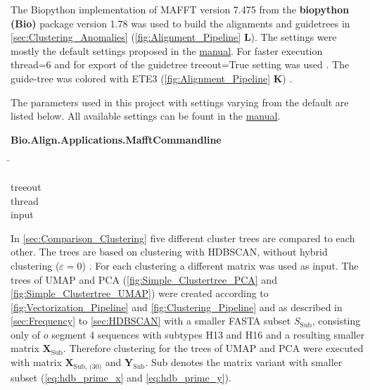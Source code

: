 The Biopython implementation of MAFFT version 7.475 from the \textbf{biopython (Bio)} package version 1.78 was used to build the alignments and guidetrees in \autoref{sec:Clustering_Anomalies} \autocite{katoh_mafft_2013, cock_biopython_2009} (\autoref{fig:Alignment_Pipeline} \textsf{\textbf{L}}). The settings were mostly the default settings proposed in the \href{https://mafft.cbrc.jp/alignment/software/}{manual}. For faster execution \colorbox{backcolour}{thread=6} and for export of the guidetree \colorbox{backcolour}{treeout=True} setting was used \autocite{katoh_mafft_2013, cock_biopython_2009}. The guide-tree was colored with ETE3 (\autoref{fig:Alignment_Pipeline} \textsf{\textbf{K}}) \autocite{huerta-cepas_ete_2016}.

The parameters used in this project with settings varying from the default are listed below. All available settings can be fount in the \href{https://mafft.cbrc.jp/alignment/software/}{manual}.

\begin{leftbar}
    \textbf{Bio.Align.Applications.MafftCommandline}
    \begin{nstabbing}
        \qquad\qquad\qquad\qquad\qquad\quad\=\kill
    
        treeout \\
        
        thread \\
        
        input 
        
    \end{nstabbing}
\end{leftbar}

In \autoref{sec:Comparison_Clustering} five different cluster trees are compared to each other. The trees are based on clustering with \gls{HDBSCAN}, without hybrid clustering ($\varepsilon=0$) \autocite{malzer_hybrid_2020, mcinnes_hdbscan_2017}. For each clustering a different matrix was used as input. The trees of \gls{UMAP} and \gls{PCA} (\autoref{fig:Simple_Clustertree_PCA} and \autoref{fig:Simple_Clustertree_UMAP}) were created according to \autoref{fig:Vectorization_Pipeline} and \autoref{fig:Clustering_Pipeline} and as described in \autoref{sec:Frequency} to \autoref{sec:HDBSCAN} with a smaller FASTA subset $S_{\text{Sub}}$, consisting only of $o$ segment 4 sequences with subtypes H13 and H16 and a resulting smaller matrix $\mathbf{X}_{\text{Sub}}$. Therefore clustering for the trees of \gls{UMAP} and \gls{PCA} were executed with matrix $\mathbf{X}_{\text{Sub, (30)}}$ and $\mathbf{Y}_{\text{Sub}}$. Sub denotes the matrix variant with smaller subset (\autoref{eq:hdb_prime_x} and \autoref{eq:hdb_prime_y}). 

